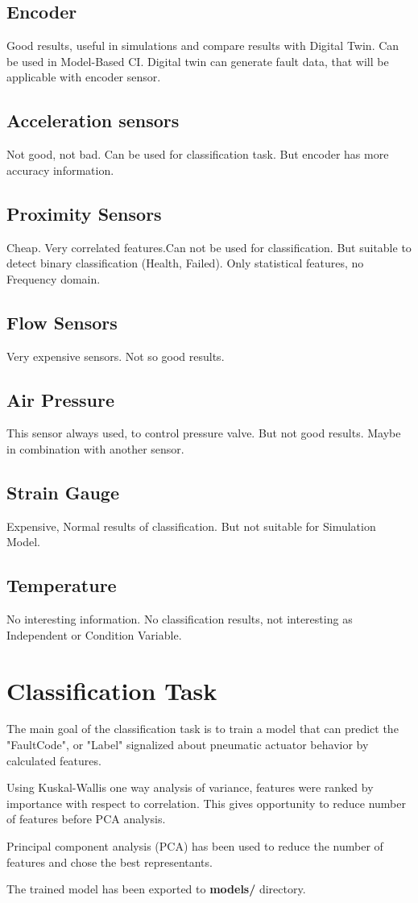 \subsection{Encoder}
Good results, useful in simulations and compare results with Digital Twin.
Can be used in Model-Based CI. 
Digital twin can generate fault data, that will be applicable with encoder
sensor.

\subsection{Acceleration sensors}
Not good, not bad. Can be used for classification task. But encoder has
more accuracy information.

\subsection{Proximity Sensors}
Cheap. Very correlated features.Can not be used for classification. But suitable
to detect binary classification (Health, Failed).
Only statistical features, no Frequency domain.

\subsection{Flow Sensors}
Very expensive sensors. Not so good results.

\subsection{Air Pressure}
This sensor always used, to control pressure valve. But not good results.
Maybe in combination with another sensor.

\subsection{Strain Gauge}
Expensive, Normal results of classification. But not suitable for
Simulation Model.

\subsection{Temperature}
No interesting information. No classification results, not interesting as
Independent or Condition Variable.

\section{Classification Task}

The main goal of the classification task is to train a model that can
predict the "FaultCode", or "Label" signalized about pneumatic actuator behavior by
calculated features.

Using Kuskal-Wallis one way analysis of variance, features were ranked by
importance with respect to correlation. This gives opportunity to reduce
number of features before PCA analysis.

Principal component analysis (PCA) has been used to reduce the number of
features and chose the best representants.

The trained model has been exported to \textbf{models/} directory.

